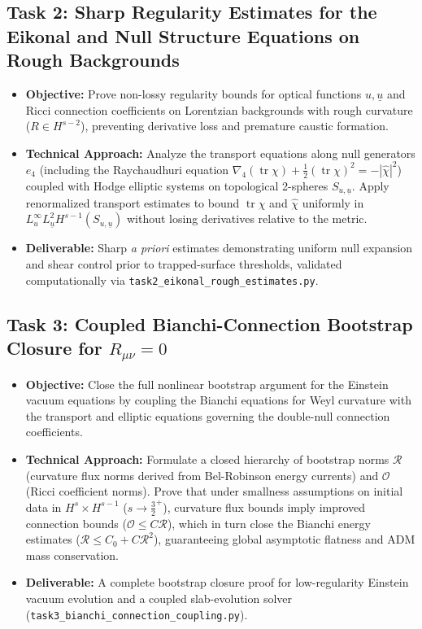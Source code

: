 \documentclass[11pt, a4paper]{article}
\begin{document}
\subsection*{Task 2: Sharp Regularity Estimates for the Eikonal and Null Structure Equations on Rough Backgrounds}
\begin{itemize}
    \item \textbf{Objective:} Prove non-lossy regularity bounds for optical functions $u, \underline{u}$ and Ricci connection coefficients on Lorentzian backgrounds with rough curvature ($R \in H^{s-2}$), preventing derivative loss and premature caustic formation.
    \item \textbf{Technical Approach:} Analyze the transport equations along null generators $e_4$ (including the Raychaudhuri equation $\nabla_4(\operatorname{tr}\chi) + \frac{1}{2}(\operatorname{tr}\chi)^2 = -|\hat{\chi}|^2$) coupled with Hodge elliptic systems on topological 2-spheres $S_{u,\underline{u}}$. Apply renormalized transport estimates to bound $\operatorname{tr}\chi$ and $\hat{\chi}$ uniformly in $L^\infty_u L^2_{\underline{u}} H^{s-1}(S_{u,\underline{u}})$ without losing derivatives relative to the metric.
    \item \textbf{Deliverable:} Sharp \textit{a priori} estimates demonstrating uniform null expansion and shear control prior to trapped-surface thresholds, validated computationally via \texttt{task2\_eikonal\_rough\_estimates.py}.
\end{itemize}

\subsection*{Task 3: Coupled Bianchi-Connection Bootstrap Closure for $R_{\mu\nu} = 0$}
\begin{itemize}
    \item \textbf{Objective:} Close the full nonlinear bootstrap argument for the Einstein vacuum equations by coupling the Bianchi equations for Weyl curvature with the transport and elliptic equations governing the double-null connection coefficients.
    \item \textbf{Technical Approach:} Formulate a closed hierarchy of bootstrap norms $\mathcal{R}$ (curvature flux norms derived from Bel-Robinson energy currents) and $\mathcal{O}$ (Ricci coefficient norms). Prove that under smallness assumptions on initial data in $H^s \times H^{s-1}$ ($s \to \frac{3}{2}^+$), curvature flux bounds imply improved connection bounds ($\mathcal{O} \le C \mathcal{R}$), which in turn close the Bianchi energy estimates ($\mathcal{R} \le C_0 + C \mathcal{R}^2$), guaranteeing global asymptotic flatness and ADM mass conservation.
    \item \textbf{Deliverable:} A complete bootstrap closure proof for low-regularity Einstein vacuum evolution and a coupled slab-evolution solver (\texttt{task3\_bianchi\_connection\_coupling.py}).
\end{itemize}
\end{document}
